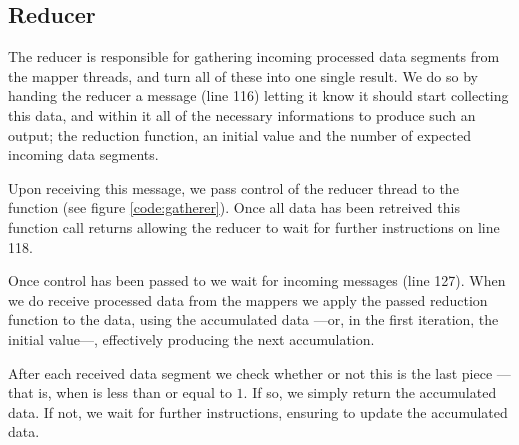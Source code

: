\subsection{Reducer}
The reducer is responsible for gathering incoming processed data segments from
the mapper threads, and turn all of these into one single result. We do so by
handing the reducer a message (line 116) letting it know it should start
collecting this data, and within it all of the necessary informations to
produce such an output; the reduction function, an initial value and the
number of expected incoming data segments.

Upon receiving this message, we pass control of the reducer thread to the
 function (see figure \ref{code:gatherer}).
Once all data has been retreived this function call returns allowing the
reducer to wait for further instructions on line 118.


Once control has been passed to  we wait for
incoming  messages (line 127). When we do receive processed data
from the mappers we apply the passed reduction function to the data, using the
accumulated data ---or, in the first iteration, the initial value---,
effectively producing the next accumulation.


After each received data segment we check whether or not this is the last
piece --- that is, when  is less than or equal to $1$. If so, we
simply return the accumulated data. If not, we wait for further instructions,
ensuring to update the accumulated data.
